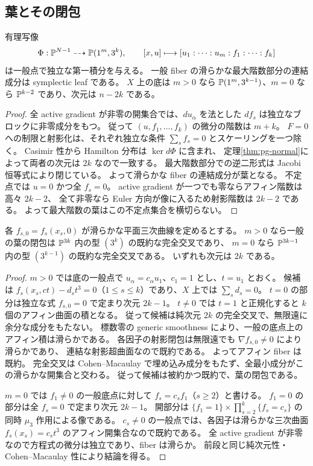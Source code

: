 \subsection{葉とその閉包}
\begin{proposition}\label{prop:pg-first-integrals}
有理写像
\[
\Phi:\mathbb P^{N-1}\dashrightarrow\mathbb P(1^m,3^k),\qquad
[x,u]\longmapsto[u_1:\cdots:u_m:f_1:\cdots:f_k]
\]
は一般点で独立な第一積分を与える。
一般 fiber の滑らかな最大階数部分の連結成分は symplectic leaf である。
$X$ 上の底は $m>0$ なら $\mathbb P(1^m,3^{k-1})$、$m=0$ なら $\mathbb P^{k-2}$ であり、次元は $n-2k$ である。
\end{proposition}
\begin{proof}
全 active gradient が非零の開集合では、$du_\alpha$ を法とした $df_s$ は独立なブロックに非零成分をもつ。
従って $(u,f_1,\ldots,f_k)$ の微分の階数は $m+k$。
$F=0$ への制限と射影化は、それぞれ独立な条件 $\sum_sf_s=0$ とスケーリングを一つ除く。
Casimir 性から Hamilton 分布は $\ker d\Phi$ に含まれ、
定理\ref{thm:pg-normal}によって両者の次元は $2k$ なので一致する。
最大階数部分での逆二形式は Jacobi 恒等式により閉じている。
よって滑らかな fiber の連結成分が葉となる。
不定点では $u=0$ かつ全 $f_s=0$。
active gradient が一つでも零ならアフィン階数は高々 $2k-2$、
全て非零なら Euler 方向が像に入るため射影階数は $2k-2$ である。
よって最大階数の葉はこの不定点集合を横切らない。
\end{proof}
\begin{proposition}\label{prop:pg-leaf-closure}
各 $f_{s,0}=f_s(x_s,0)$ が滑らかな平面三次曲線を定めるとする。
$m>0$ なら一般の葉の閉包は $\mathbb P^{3k}$ 内の型 $(3^k)$ の既約な完全交叉であり、
$m=0$ なら $\mathbb P^{3k-1}$ 内の型 $(3^{k-1})$ の既約な完全交叉である。
いずれも次元は $2k$ である。
\end{proposition}
\begin{proof}
$m>0$ では底の一般点で $u_\alpha=c_\alpha u_1$、$c_1=1$ とし、$t=u_1$ とおく。
候補は $f_s(x_s,ct)-d_st^3=0$（$1\leq s\leq k$）であり、$X$ 上では $\sum_sd_s=0$。
$t=0$ の部分は独立な式 $f_{s,0}=0$ で定まり次元 $2k-1$。
$t\neq0$ では $t=1$ と正規化すると $k$ 個のアフィン曲面の積となる。
従って候補は純次元 $2k$ の完全交叉で、無限遠に余分な成分をもたない。
標数零の generic smoothness により、一般の底点上のアフィン積は滑らかである。
各因子の射影閉包は無限遠でも $\nabla f_{s,0}\neq0$ により滑らかであり、
連結な射影超曲面なので既約である。
よってアフィン fiber は既約。
完全交叉は Cohen--Macaulay で埋め込み成分をもたず、全最小成分がこの滑らかな開集合と交わる。
従って候補は被約かつ既約で、葉の閉包である。

$m=0$ では $f_1\neq0$ の一般底点に対して $f_s=c_sf_1$（$s\geq2$）と書ける。
$f_1=0$ の部分は全 $f_s=0$ で定まり次元 $2k-1$。
開部分は $\{f_1=1\}\times\prod_{s=2}^k\{f_s=c_s\}$ の同時 $\mu_3$ 作用による像である。
$c_s\neq0$ の一般点では、各因子は滑らかな三次曲面
$f_s(x_s)=c_st^3$ のアフィン開集合なので既約である。
全 active gradient が非零なので方程式の微分は独立であり、fiber は滑らか。
前段と同じ純次元性・Cohen--Macaulay 性により結論を得る。
\end{proof}
